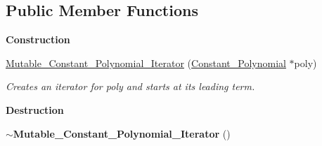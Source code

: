 \subsection*{Public Member Functions}
\begin{Indent}\textbf{ Construction}\par
\begin{DoxyCompactItemize}
\item 
\mbox{\label{class_mutable___constant___polynomial___iterator_ac443c5f24675fc7c8fb69bbd167b634b}} 
\hyperlink{class_mutable___constant___polynomial___iterator_ac443c5f24675fc7c8fb69bbd167b634b}{Mutable\+\_\+\+Constant\+\_\+\+Polynomial\+\_\+\+Iterator} (\hyperlink{class_constant___polynomial}{Constant\+\_\+\+Polynomial} $\ast$poly)
\begin{DoxyCompactList}\small\item\em Creates an iterator for {\ttfamily poly} and starts at its leading term. \end{DoxyCompactList}\end{DoxyCompactItemize}
\end{Indent}
\begin{Indent}\textbf{ Destruction}\par
\begin{DoxyCompactItemize}
\item 
\mbox{\label{class_mutable___constant___polynomial___iterator_a7a4ed35d8a8429bfaf395b034643941b}} 
{\bfseries $\sim$\+Mutable\+\_\+\+Constant\+\_\+\+Polynomial\+\_\+\+Iterator} ()
\end{DoxyCompactItemize}
\end{Indent}
